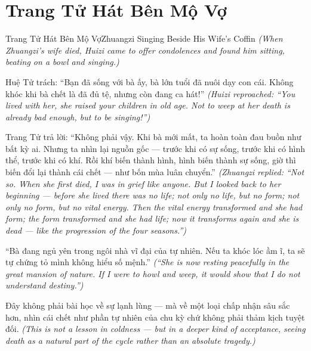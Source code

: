 \section{Trang Tử Hát Bên Mộ Vợ}
\begin{truyen}{Trang Tử Hát Bên Mộ Vợ}{Zhuangzi Singing Beside His Wife's Coffin}
\textit{(When Zhuangzi's wife died, Huizi came to offer condolences and found him sitting, beating on a bowl and singing.)}

Huệ Tử trách: ``Bạn đã sống với bà ấy, bà lớn tuổi đã nuôi dạy con cái. Không khóc khi bà chết là đã đủ tệ, nhưng còn đang ca hát!''
\textit{(Huizi reproached: ``You lived with her, she raised your children in old age. Not to weep at her death is already bad enough, but to be singing!'')}

Trang Tử trả lời: ``Không phải vậy. Khi bà mới mất, ta hoàn toàn đau buồn như bất kỳ ai. Nhưng ta nhìn lại nguồn gốc — trước khi có sự sống, trước khi có hình thể, trước khi có khí. Rồi khí biến thành hình, hình biến thành sự sống, giờ thì biến đổi lại thành cái chết — như bốn mùa luân chuyển.''
\textit{(Zhuangzi replied: ``Not so. When she first died, I was in grief like anyone. But I looked back to her beginning — before she lived there was no life; not only no life, but no form; not only no form, but no vital energy. Then the vital energy transformed and she had form; the form transformed and she had life; now it transforms again and she is dead — like the progression of the four seasons.'')}

``Bà đang ngủ yên trong ngôi nhà vĩ đại của tự nhiên. Nếu ta khóc lóc ầm ĩ, ta sẽ tự chứng tỏ mình không hiểu số mệnh.''
\textit{(``She is now resting peacefully in the great mansion of nature. If I were to howl and weep, it would show that I do not understand destiny.'')}

\end{truyen}

\begin{baihoc}
Đây không phải bài học về sự lạnh lùng — mà về một loại chấp nhận sâu sắc hơn, nhìn cái chết như phần tự nhiên của chu kỳ chứ không phải thảm kịch tuyệt đối.
\textit{(This is not a lesson in coldness — but in a deeper kind of acceptance, seeing death as a natural part of the cycle rather than an absolute tragedy.)}
\end{baihoc}
\ngancach


